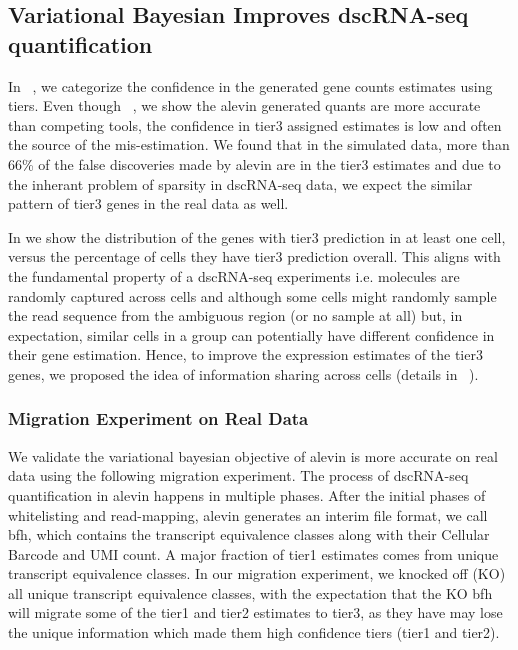 \subsection{Variational Bayesian Improves dscRNA-seq quantification}
In ~, we categorize the confidence in the generated gene counts estimates using tiers. 
Even though ~, we show the alevin generated quants are more accurate
than competing tools, the confidence in tier3 assigned estimates is low and often the source of 
the mis-estimation. We found that in the simulated data, more than 66\% of the false discoveries made 
by alevin are in the tier3 estimates and due to the inherant problem of sparsity in dscRNA-seq data,
we expect the similar pattern of tier3 genes in the real data as well. 

In  we show the distribution of the genes with tier3 prediction in at least one cell,
versus the percentage of cells they have tier3 prediction overall. This aligns with the fundamental 
property of a dscRNA-seq experiments i.e. molecules are randomly captured across cells and although
some cells might randomly sample the read sequence from the ambiguous region (or no sample at all) but, 
in expectation, similar cells in a group can potentially have different confidence in their gene
estimation. Hence, to improve the expression estimates of the tier3 genes, we proposed the idea of 
information sharing across cells (details in ~).

\subsubsection{Migration Experiment on Real Data}
We validate the variational bayesian objective of alevin is more accurate on real data using the
following migration experiment. The process of dscRNA-seq quantification in alevin happens in multiple 
phases. After the initial phases of whitelisting and read-mapping, alevin generates an interim 
file format, we call bfh, which contains the transcript equivalence classes along with their Cellular
Barcode and UMI count. A major fraction of tier1 estimates comes from unique transcript equivalence
classes. In our migration experiment, we knocked off (KO) all unique transcript equivalence classes, with
the expectation that the KO bfh will migrate some of the tier1 and tier2 estimates to tier3, as they have
may lose the unique information which made them high confidence tiers (tier1 and tier2). 

